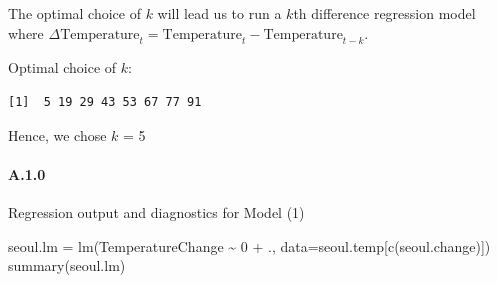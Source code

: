 \documentclass[
  letterpaper,
  DIV=11,
  numbers=noendperiod]{scrartcl}
\let\oldparagraph\paragraph
\renewcommand{\paragraph}[1]{\oldparagraph{#1}\mbox{}}
\newenvironment{Shaded}{\begin{snugshade}}{\end{snugshade}}
\newcommand{\AttributeTok}[1]{\textcolor[rgb]{0.40,0.45,0.13}{#1}}
\newcommand{\ControlFlowTok}[1]{\textcolor[rgb]{0.00,0.23,0.31}{#1}}
\newcommand{\DecValTok}[1]{\textcolor[rgb]{0.68,0.00,0.00}{#1}}
\newcommand{\FloatTok}[1]{\textcolor[rgb]{0.68,0.00,0.00}{#1}}
\newcommand{\FunctionTok}[1]{\textcolor[rgb]{0.28,0.35,0.67}{#1}}
\newcommand{\NormalTok}[1]{\textcolor[rgb]{0.00,0.23,0.31}{#1}}
\newcommand{\OtherTok}[1]{\textcolor[rgb]{0.00,0.23,0.31}{#1}}
\newcommand{\SpecialCharTok}[1]{\textcolor[rgb]{0.37,0.37,0.37}{#1}}
\newcommand{\StringTok}[1]{\textcolor[rgb]{0.13,0.47,0.30}{#1}}
\begin{document}
The optimal choice of \(k\) will lead us to run a \(k\)th difference
regression model where
\(\Delta\text{Temperature}_t = \text{Temperature}_t - \text{Temperature}_{t-k}\).

Optimal choice of \(k\):

\begin{Shaded}
\end{Shaded}

\begin{verbatim}
[1]  5 19 29 43 53 67 77 91
\end{verbatim}

Hence, we chose \(k\) = 5

\hypertarget{a10}{%
\paragraph{A.1.0}\label{a10}}

Regression output and diagnostics for Model (1)

\begin{Shaded}
\begin{Highlighting}[]
\NormalTok{seoul.lm }\OtherTok{=} \FunctionTok{lm}\NormalTok{(TemperatureChange }\SpecialCharTok{\textasciitilde{}} \DecValTok{0} \SpecialCharTok{+}\NormalTok{ ., }\AttributeTok{data=}\NormalTok{seoul.temp[}\FunctionTok{c}\NormalTok{(seoul.change)])}
\FunctionTok{summary}\NormalTok{(seoul.lm)}
\end{Highlighting}
\end{Shaded}
\end{document}
